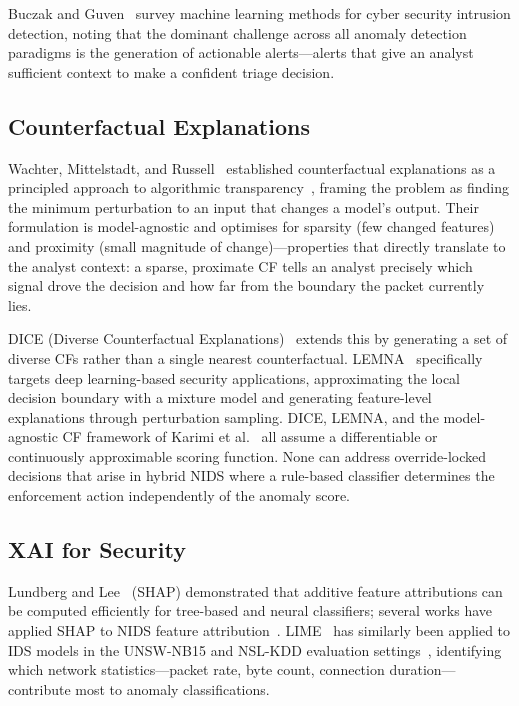 \documentclass[preprint,12pt,authoryear]{elsarticle}
\begin{document}
Buczak and Guven~\citep{Buczak2016} survey machine learning methods for cyber
security intrusion detection, noting that the dominant challenge across all
anomaly detection paradigms is the generation of actionable alerts---alerts that
give an analyst sufficient context to make a confident triage decision.

\subsection{Counterfactual Explanations}
\label{subsec:cf_background}

Wachter, Mittelstadt, and Russell~\citep{Wachter2018} established counterfactual
explanations as a principled approach to algorithmic
transparency~\citep{Molnar2022}, framing the problem as finding the minimum
perturbation to an input that changes a model's output. Their formulation is
model-agnostic and optimises for sparsity (few changed features) and proximity
(small magnitude of change)---properties that directly translate to the analyst
context: a sparse, proximate CF tells an analyst precisely which signal drove
the decision and how far from the boundary the packet currently lies.

DICE (Diverse Counterfactual Explanations)~\citep{Mothilal2020} extends this by
generating a set of diverse CFs rather than a single nearest counterfactual.
LEMNA~\citep{Guo2018} specifically targets deep learning-based security
applications, approximating the local decision boundary with a mixture model
and generating feature-level explanations through perturbation sampling.
DICE, LEMNA, and the model-agnostic CF framework of Karimi et
al.~\citep{Karimi2020} all assume a differentiable or continuously approximable
scoring function. None can address override-locked decisions that arise in
hybrid NIDS where a rule-based classifier determines the enforcement action
independently of the anomaly score.

\subsection{XAI for Security}
\label{subsec:xai_security}

Lundberg and Lee~\citep{Lundberg2017} (SHAP) demonstrated that additive feature
attributions can be computed efficiently for tree-based and neural classifiers;
several works have applied SHAP to NIDS feature
attribution~\citep{Antwarg2021}. LIME~\citep{Ribeiro2016} has similarly been
applied to IDS models in the UNSW-NB15 and NSL-KDD evaluation
settings~\citep{Wang2022}, identifying which network statistics---packet rate,
byte count, connection duration---contribute most to anomaly classifications.
\end{document}
